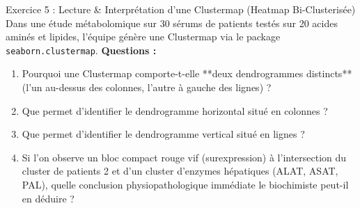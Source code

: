\documentclass[11pt,a4paper]{article}
\begin{document}
\begin{exercicebox}{Exercice 5 : Lecture \& Interprétation d'une Clustermap (Heatmap Bi-Clusterisée)}
Dans une étude métabolomique sur 30 sérums de patients testés sur 20 acides aminés et lipides, l'équipe génère une Clustermap via le package \texttt{seaborn.clustermap}.
\textbf{Questions :}
\begin{enumerate}[label=\textbf{\alph*.}]
  \item Pourquoi une Clustermap comporte-t-elle **deux dendrogrammes distincts** (l'un au-dessus des colonnes, l'autre à gauche des lignes) ?
  \item Que permet d'identifier le dendrogramme horizontal situé en colonnes ?
  \item Que permet d'identifier le dendrogramme vertical situé en lignes ?
  \item Si l'on observe un bloc compact rouge vif (surexpression) à l'intersection du cluster de patients 2 et d'un cluster d'enzymes hépatiques (ALAT, ASAT, PAL), quelle conclusion physiopathologique immédiate le biochimiste peut-il en déduire ?
\end{enumerate}
\end{exercicebox}
\end{document}
